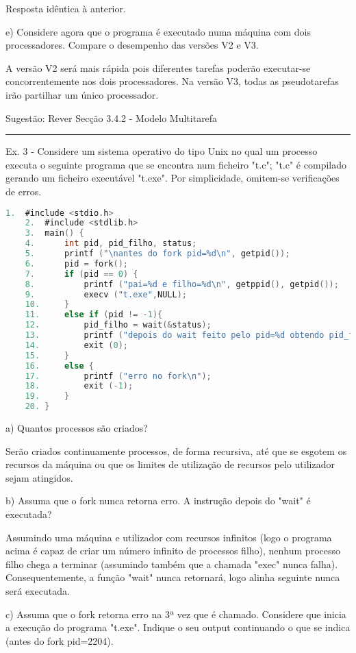 \documentclass[11pt]{article}
\begin{document}
Resposta idêntica à anterior.

e) Considere agora que o programa é executado numa máquina com dois processadores. Compare o desempenho das versões V2 e V3.

A versão V2 será mais rápida pois diferentes tarefas poderão executar-se concorrentemente nos dois processadores. Na versão V3, todas as pseudotarefas irão partilhar um único processador.

Sugestão: Rever Secção 3.4.2 - Modelo Multitarefa

\hrule

Ex. 3 - Considere um sistema operativo do tipo Unix no qual um processo executa o seguinte programa que se encontra num ficheiro "t.c"; "t.c" é compilado gerando um ficheiro executável "t.exe". Por simplicidade, omitem-se verificações de erros.

\begin{lstlisting}[language=C]
    1.  #include <stdio.h>
    2.  #include <stdlib.h>
    3.  main() {
    4.      int pid, pid_filho, status;
    5.      printf ("\nantes do fork pid=%d\n", getpid());
    6.      pid = fork();
    7.      if (pid == 0) {
    8.          printf ("pai=%d e filho=%d\n", getppid(), getpid());
    9.          execv ("t.exe",NULL);
    10.     }
    11.     else if (pid != -1){
    12.         pid_filho = wait(&status);
    13.         printf ("depois do wait feito pelo pid=%d obtendo pid_filho=%d\n", getpid(), pid_filho);
    14.         exit (0);
    15.     }
    16.     else {
    17.         printf ("erro no fork\n");
    18.         exit (-1);
    19.     }
    20. }
\end{lstlisting}


a) Quantos processos são criados?

Serão criados continuamente processos, de forma recursiva, até que se esgotem os recursos da máquina ou que os limites de utilização de recursos pelo utilizador sejam atingidos.

b) Assuma que o fork nunca retorna erro. A instrução depois do "wait" é executada?

Assumindo uma máquina e utilizador com recursos infinitos (logo o programa acima é capaz de criar um número infinito de processos filho), nenhum processo filho chega a terminar (assumindo também que a chamada "exec" nunca falha). Consequentemente, a função "wait" nunca retornará, logo alinha seguinte nunca será executada.

c) Assuma que o fork retorna erro na 3ª vez que é chamado. Considere que inicia a execução do programa "t.exe". Indique o seu output continuando o que se indica (antes do fork pid=2204).
\end{document}
